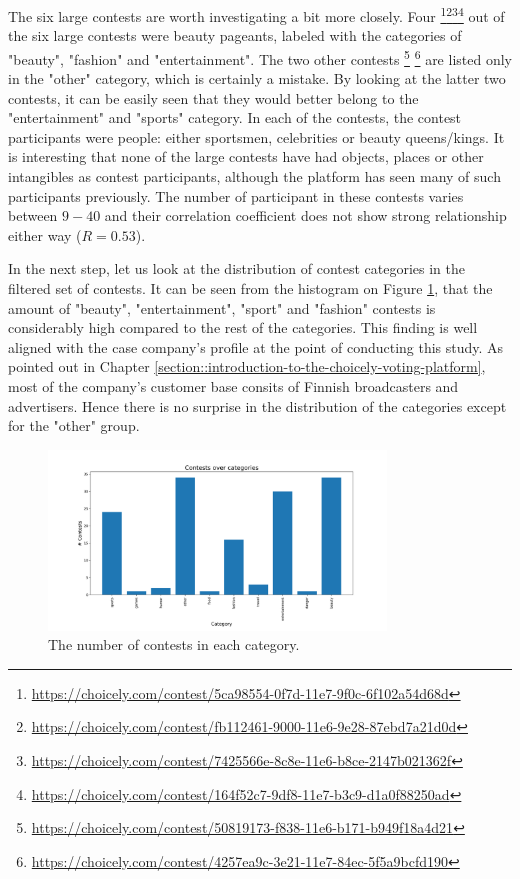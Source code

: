     The six large contests are worth investigating a bit more closely. Four \footnote{\url{https://choicely.com/contest/5ca98554-0f7d-11e7-9f0c-6f102a54d68d}}\footnote{\url{https://choicely.com/contest/fb112461-9000-11e6-9e28-87ebd7a21d0d}}\footnote{\url{https://choicely.com/contest/7425566e-8c8e-11e6-b8ce-2147b021362f}}\footnote{\url{https://choicely.com/contest/164f52c7-9df8-11e7-b3c9-d1a0f88250ad}}
    out of the six large contests were beauty pageants, labeled with the categories of "beauty", "fashion" and "entertainment". The two other contests
        \footnote{\url{https://choicely.com/contest/50819173-f838-11e6-b171-b949f18a4d21}}
        \footnote{\url{https://choicely.com/contest/4257ea9c-3e21-11e7-84ec-5f5a9bcfd190}}
    are listed only in the "other" category, which is certainly a mistake. By looking at the latter two contests, it can be easily seen that they would better belong to the "entertainment" and "sports" category. In each of the contests, the contest participants were people: either sportsmen, celebrities or beauty queens/kings. It is interesting that none of the large contests have had objects, places or other intangibles as contest participants, although the platform has seen many of such participants previously. The number of participant in these contests varies between $9-40$ and their correlation coefficient does not show strong relationship either way ($R = 0.53$). 

    In the next step, let us look at the distribution of contest categories in the filtered set of contests. It can be seen from the histogram on Figure \ref{contests_over_categories}, that the amount of "beauty", "entertainment", "sport" and "fashion" contests is considerably high compared to the rest of the categories. This finding is well aligned with the case company's profile at the point of conducting this study. As pointed out in Chapter \ref{section::introduction-to-the-choicely-voting-platform}, most of the company's customer base consits of Finnish broadcasters and advertisers. Hence there is no surprise in the distribution of the categories except for the "other" group. 
    
    \begin{figure}[h] 
        \begin{center}
            \includegraphics[width=0.8\textwidth]{Images/contests_over_categories.png}
            \caption{The number of contests in each category.}
            \label{contests_over_categories}
        \end{center}
    \end{figure}
    

